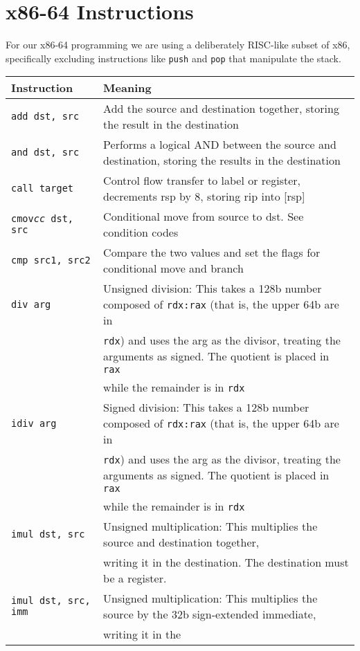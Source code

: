 \clearpage

\section{x86-64 Instructions}

For our x86-64 programming we are using a deliberately RISC-like
subset of x86, specifically excluding instructions like {\tt push} and
{\tt pop} that manipulate the stack.

\vspace{0.2in}
\begin{tabular}{l|l} \hline
  Instruction & Meaning \\ \hline
\tt add dst, src & Add the source and destination together, storing the
result in the destination \\
\tt and dst, src & Performs a logical AND between the source and
destination, storing the results in the destination \\
\tt call target & Control flow transfer to label or register, decrements rsp by 8,
storing rip into [rsp] \\
\tt cmov{\it cc} dst, src & Conditional move from source to dst. See condition
codes \\
\tt cmp src1, src2 & Compare the two values and set the flags for conditional
move and branch \\
\tt div arg & Unsigned division: This takes a 128b number composed
of {\tt rdx:rax} (that is, the upper 64b are in \\
  & {\tt rdx}) and uses
the arg as the divisor, treating the arguments as signed.
The quotient is placed in {\tt rax} \\
& while the remainder is in {\tt rdx} \\
\tt idiv arg & Signed division: This takes a 128b number composed
of {\tt rdx:rax} (that is, the upper 64b are in \\
  & {\tt rdx}) and uses
the arg as the divisor, treating the arguments as signed.
The quotient is placed in {\tt rax} \\
& while the remainder is in {\tt rdx} \\
\tt imul dst, src & Unsigned multiplication: This multiplies the source and
destination together, \\ & writing it in the destination. The
destination must be a register. \\ 
\tt imul dst, src, imm & Unsigned multiplication: This multiplies the source by
the 32b sign-extended immediate, \\ & writing it in the

\end{tabular}
